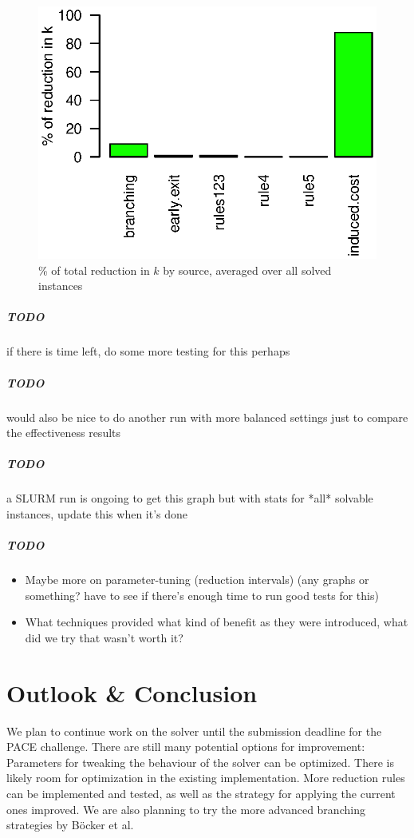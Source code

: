 \documentclass[12pt,oneside,english,parskip=full,headings=small]{scrbook}
\newcommand{\todo}[1]{\paragraph{TODO} #1}
\theoremstyle{definition}
\begin{document}
\begin{figure}[h]
	\centering
	\includegraphics[scale=0.8]{interleaved_effectiveness}
	\caption{\% of total reduction in $k$ by source, averaged over all solved instances}
	\label{fig:interleaved_effectiveness}
\end{figure}

\todo if there is time left, do some more testing for this perhaps

\todo would also be nice to do another run with more balanced settings just to compare the
effectiveness results

\todo a SLURM run is ongoing to get this graph but with stats for *all* solvable instances, update
this when it's done

\todo

\begin{itemize}
	\item Maybe more on parameter-tuning (reduction intervals) (any graphs or something? have to see
		if there's enough time to run good tests for this)
	\item What techniques provided what kind of benefit as they were introduced, what did we try
		that wasn't worth it?
\end{itemize}

\chapter{Outlook \& Conclusion}

We plan to continue work on the solver until the submission deadline for the PACE challenge. There
are still many potential options for improvement: Parameters for tweaking the behaviour of the
solver can be optimized. There is likely room for optimization in the existing implementation. More
reduction rules can be implemented and tested, as well as the strategy for applying the current ones
improved. We are also planning to try the more advanced branching strategies by Böcker et
al.~\cite{GoldenRatio}
\end{document}
